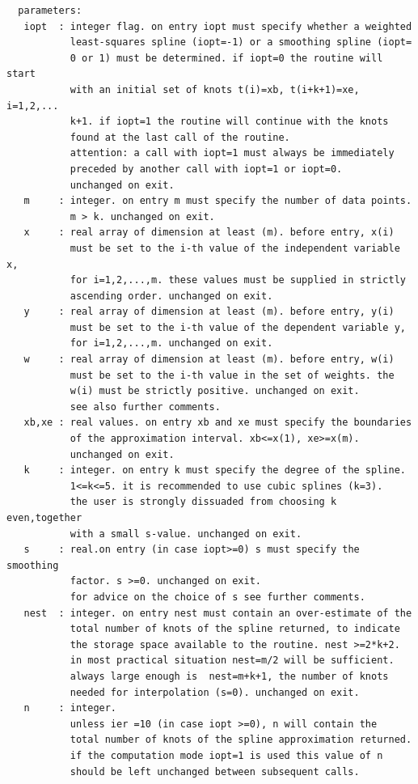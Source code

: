 \documentclass[11pt,twoside]{article}
\begin{document}
\begin{verbatim}
  parameters:
   iopt  : integer flag. on entry iopt must specify whether a weighted
           least-squares spline (iopt=-1) or a smoothing spline (iopt=
           0 or 1) must be determined. if iopt=0 the routine will start
           with an initial set of knots t(i)=xb, t(i+k+1)=xe, i=1,2,...
           k+1. if iopt=1 the routine will continue with the knots
           found at the last call of the routine.
           attention: a call with iopt=1 must always be immediately
           preceded by another call with iopt=1 or iopt=0.
           unchanged on exit.
   m     : integer. on entry m must specify the number of data points.
           m > k. unchanged on exit.
   x     : real array of dimension at least (m). before entry, x(i)
           must be set to the i-th value of the independent variable x,
           for i=1,2,...,m. these values must be supplied in strictly
           ascending order. unchanged on exit.
   y     : real array of dimension at least (m). before entry, y(i)
           must be set to the i-th value of the dependent variable y,
           for i=1,2,...,m. unchanged on exit.
   w     : real array of dimension at least (m). before entry, w(i)
           must be set to the i-th value in the set of weights. the
           w(i) must be strictly positive. unchanged on exit.
           see also further comments.
   xb,xe : real values. on entry xb and xe must specify the boundaries
           of the approximation interval. xb<=x(1), xe>=x(m).
           unchanged on exit.
   k     : integer. on entry k must specify the degree of the spline.
           1<=k<=5. it is recommended to use cubic splines (k=3).
           the user is strongly dissuaded from choosing k even,together
           with a small s-value. unchanged on exit.
   s     : real.on entry (in case iopt>=0) s must specify the smoothing
           factor. s >=0. unchanged on exit.
           for advice on the choice of s see further comments.
   nest  : integer. on entry nest must contain an over-estimate of the
           total number of knots of the spline returned, to indicate
           the storage space available to the routine. nest >=2*k+2.
           in most practical situation nest=m/2 will be sufficient.
           always large enough is  nest=m+k+1, the number of knots
           needed for interpolation (s=0). unchanged on exit.
   n     : integer.
           unless ier =10 (in case iopt >=0), n will contain the
           total number of knots of the spline approximation returned.
           if the computation mode iopt=1 is used this value of n
           should be left unchanged between subsequent calls.

\end{verbatim}
\end{document}
